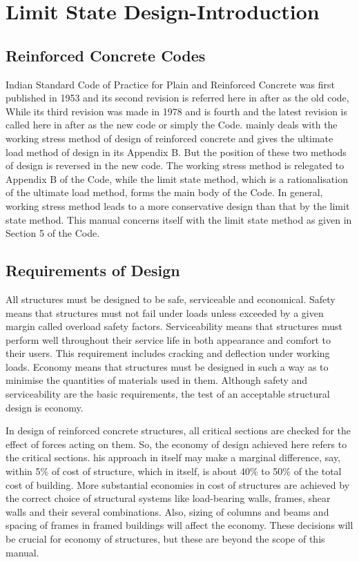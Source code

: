 \chapter{Limit State Design-Introduction}
\section{Reinforced Concrete Codes}

Indian Standard Code of Practice for Plain and Reinforced Concrete was 
first published in 1953 and its second revision 
is referred here in after as the old code, While its third revision
was made in 1978 and is fourth and the latest revision
 is called here in after as the new code or
simply the Code.  mainly deals with the
working stress method of design of reinforced concrete and gives the 
ultimate load method of design in its Appendix B. But the position of 
these two methods of design is reversed in the new code. The working 
stress method is relegated to Appendix B of the Code, while the limit
state method, which is a rationalisation of the ultimate load method, 
forms the main body of the Code. In general, working stress method leads
to a more conservative design than that by the limit state method. This 
manual concerns itself with the limit state method as given in Section
5 of the Code.

\section{Requirements of Design}

All structures must be designed to be safe, serviceable and economical.
Safety means that structures must not fail under loads unless exceeded 
by a given margin called overload safety factors. Serviceability means 
that structures must perform well throughout their service life in both
appearance and comfort to their users. This requirement includes cracking
and deﬂection under working loads. Economy means that structures must be 
designed in such a way as to minimise the quantities of materials used in
them. Although safety and serviceability are the basic requirements, the 
test of an acceptable structural design is economy.

In design of reinforced concrete structures, all critical sections are
checked for the effect of forces acting on them. So, the economy of
design achieved here refers to the critical sections. his approach in
itself may make a marginal difference, say, within 5\% of cost of
structure, which in itself, is about 40\% to 50\% of the total cost of
building. More substantial economies in cost of structures are achieved 
by the correct choice of structural systems like load-bearing walls,
frames, shear walls and their several combinations. Also, sizing of
columns and beams and spacing of frames in framed buildings will affect
the economy. These decisions will be crucial for economy of structures,
but these are beyond the scope of this manual.

